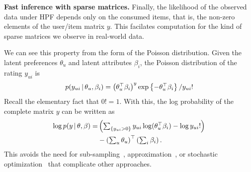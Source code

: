 {\bf Fast inference with sparse matrices.}  Finally, the likelihood of
the observed data under HPF depends only on the consumed
items, that is, the non-zero elements of the user/item matrix $y$.
This facilates computation for the kind of sparse matrices we
observe in real-world data.

We can see this property from the form of the Poisson distribution.
Given the latent preferences $\theta_u$ and latent attributes
$\beta_i$, the Poisson distribution of the rating $y_{ui}$ is
\begin{equation}
  p(y_{ui} \,\vert\, \theta_u, \beta_i) =
  \left(\theta_u^\top \beta_i\right)^y
  \exp\left\{-\theta_u^\top \beta_i \right\} / y_{ui}!
\end{equation}
Recall the elementary fact that $0! = 1$.  With this, the log
probability of the complete matrix $y$ can be written as
\begin{align}
  \log p(y \,\vert\, \theta, \beta) =
  & \left(\textstyle \sum_{\{y_{ui} > 0\}}
    y_{ui} \log (\theta_u^\top \beta_i) - \log y_{ui}!
  \right) \\
  & -
  \left(\textstyle\sum_{u} \theta_u\right)^\top \left(\textstyle
    \sum_{i} \beta_i\right). \nonumber
\end{align}
This avoids the need for sub-sampling~\cite{Dror:2012a},
approximation~\cite{Hu:2008p9402}, or stochastic
optimization~\cite{Mairal:2010} that complicate other approaches.
